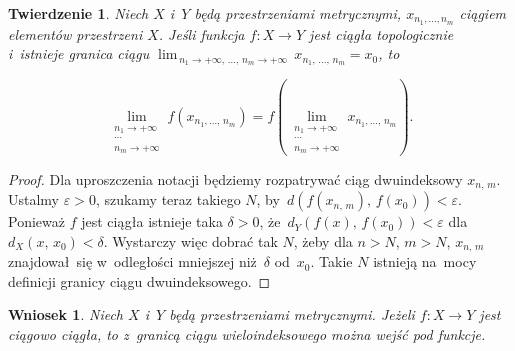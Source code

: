 \documentclass[a4paper,11pt]{article}
\numberwithin{equation}{section}
\newtheorem{corollary}{Wniosek}
\newtheorem{theorem}{Twierdzenie}
\begin{document}
\begin{theorem}

  Niech $X$ i~$Y$ będą przestrzeniami metrycznymi,
  $x_{ n_{ 1 }, \ldots, n_{ m } }$ ciągiem elementów przestrzeni $X$.
  Jeśli funkcja $f: X \to Y$ jest ciągła topologicznie i~istnieje
  granica ciągu
  $\lim_{ \, n_{ 1 } \to +\infty, \, \ldots, \, n_{ m } \to +\infty } \, x_{ n_{ 1 }, \, \ldots, \, n_{ m } } = x_{ 0 }$, to

  \begin{equation}
    \label{eq:RS-Vol-I-s01-11}
    \lim\limits_{ \substack{ n_{ 1 } \to +\infty \\
        \cdots \\
        n_{ m } \to +\infty } }
    f( x_{ n_{ 1 }, \ldots, \, n_{ m } } )
    = f( \lim\limits_{ \substack{ n_{ 1 } \to +\infty \\
        \cdots \\
        n_{ m } \to +\infty } } x_{ n_{ 1 }, \ldots, \, n_{ m } } ).
  \end{equation}

\end{theorem}



\begin{proof}

  Dla uproszczenia notacji będziemy rozpatrywać ciąg dwuindeksowy
  $x_{ n, \, m }$. Ustalmy $\varepsilon > 0$, szukamy teraz takiego $N$,
  by~$d( f( x_{ n, \, m } ),\, f( x_{ 0 } ) ) < \varepsilon$. Ponieważ $f$
  jest ciągła istnieje taka $\delta > 0$, \linebreak
  że~$d_{ Y }( f( x ),\, f( x_{ 0 } ) ) < \varepsilon$
  dla~$d_{ X }( x,\, x_{ 0 } ) < \delta$. Wystarczy więc dobrać tak $N$,
  żeby dla $n > N$, $m > N$, $x_{ n, \, m }$ znajdował~się
  w~odległości mniejszej niż~$\delta$ od~$x_{ 0 }$. Takie $N$ istnieją
  na~mocy definicji granicy ciągu dwuindeksowego.

\end{proof}





\begin{corollary}

  Niech $X$ i~$Y$ będą przestrzeniami metrycznymi. Jeżeli $f: X \to Y$
  jest ciągowo ciągła, to z~granicą ciągu wieloindeksowego można wejść
  pod funkcje.

\end{corollary}
\end{document}
